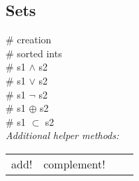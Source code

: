 \subsection*{Sets}
 \# creation \\
 \# sorted ints \\
 \# s1 $\land$ s2 \\
 \# s1 $\lor$ s2 \\
 \# s1 $\neg$ s2 \\
 \# s1 $\oplus$ s2 \\ \# s1 $\subset$ s2 \\[2mm]
\textit{Additional helper methods:}\\
\begin{tabular}{l l l l}
    add! & complement! \\
\end{tabular} \